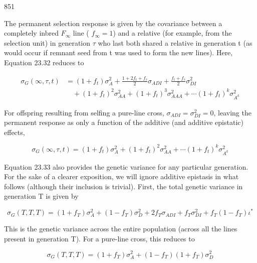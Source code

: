 \documentclass{article}
\begin{document}
851

The permanent selection response is given by the covariance between a completely inbred  $ F_{\infty} $ line ( $ f_{\infty} = 1 $) and a relative (for example, from the selection unit) in generation  $ \tau $ who last both shared a relative in generation t (as would occur if remnant seed from t was used to form the new lines). Here, Equation 23.32 reduces to

\begin{equation}
\begin{aligned}\sigma_{G}(\infty,\tau,t)&=(1+f_{t})\sigma_{A}^{2}+\frac{1+2f_{t}+f_{\tau}}{2}\sigma_{ADI}+\frac{f_{t}+f_{\tau}}{2}\sigma_{DI}^{2}\\&\quad+(1+f_{t})^{2}\sigma_{AA}^{2}+(1+f_{t})^{3}\sigma_{AAA}^{2}+\cdots(1+f_{t})^{k}\sigma_{A^{k}}^{2}\end{aligned}
\tag{23.34a}
\label{eq:23_34a}
\end{equation}

For offspring resulting from selfing a pure-line cross,  $ \sigma_{ADI} = \sigma_{DI}^2 = 0 $, leaving the permanent response as only a function of the additive (and additive epistatic) effects,

\begin{equation}
\sigma_{G}(\infty,\tau,t)=(1+f_{t})\sigma_{A}^{2}+(1+f_{t})^{2}\sigma_{A A}^{2}+\cdots(1+f_{t})^{k}\sigma_{A^{k}}^{2}
\tag{23.34b}
\label{eq:23_34b}
\end{equation}

Equation 23.33 also provides the genetic variance for any particular generation. For the sake of a clearer exposition, we will ignore additive epistasis in what follows (although their inclusion is trivial). First, the total genetic variance in generation T is given by

\begin{equation}
\sigma_{G}(T,T,T)=(1+f_{T})\sigma_{A}^{2}+(1-f_{T})\sigma_{D}^{2}+2f_{T}\sigma_{ADI}+f_{T}\sigma_{DI}^{2}+f_{T}(1-f_{T})\iota^{*}
\tag{23.35a}
\label{eq:23_35a}
\end{equation}

This is the genetic variance across the entire population (across all the lines present in generation T). For a pure-line cross, this reduces to

\begin{equation}
\sigma_{G}(T,T,T)=(1+f_{T})\sigma_{A}^{2}+(1-f_{T})(1+f_{T})\sigma_{D}^{2}
\tag{23.35b}
\label{eq:23_35b}
\end{equation}
\end{document}
